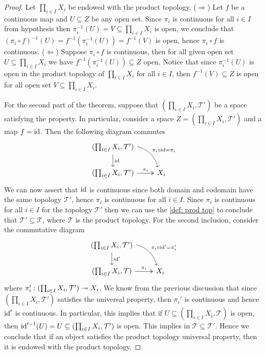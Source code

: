 \begin{proof}
  Let \(\prod_{i \in I} X_i\) be endowed with the product topology.
  (\(\Rightarrow\)) Let \(f\) be a continuous map and \(U \subseteq Z\) be any
  open set. Since \(\pi_i\) is continuous for all \(i \in I\) from hypothesis
  then \(\pi_i^{-1}(U) = V \subseteq \prod_{i \in I} X_i\) is open, we conclude
  that \((\pi_i \circ f)^{-1}(U) = f^{-1}(\pi_i^{-1}(U)) = f^{-1}(V)\) is open,
  hence \(\pi_i \circ f\) is continuous. (\(\Leftarrow\)) Suppose \(\pi_i \circ
  f\) is continuous, then for all given open set \(U \subseteq \prod_{i \in I}
  X_i\) we have \(f^{-1}(\pi_i^{-1}(U)) \subseteq Z\) open. Notice that since
  \(\pi_i^{-1}(U)\) is open in the product topology of \(\prod_{i \in I} X_i\)
  for all \(i \in I\), then \(f^{-1}(V) \subseteq Z\) is open for all open set
  \(V \subseteq \prod_{i \in I} X_i\).

  For the second part of the theorem, suppose that \((\prod_{i \in I} X_i,
  \mathcal T')\) be a space satisfying the property. In particular, consider a
  space \(Z = (\prod_{i \in I} X_i, \mathcal T')\) and a map \(f = \operatorname{id}\). Then
  the following diagram commutes
  \[
    \begin{tikzcd}
      (\prod_{i \in I} X_i, \mathcal T') 
      \ar[d, "\Id"] 
      \ar[dr, bend left, "\pi_i \circ \Id = \pi_i"] \\
      (\prod_{i \in I} X_i, \mathcal T')
      \ar[r, two heads, "\pi_i"]
        &X_i 
    \end{tikzcd}
  \] 
  We can now assert that \(\operatorname{id}\) is continuous since both domain and codomain
  have the same topology \(\mathcal T'\), hence \(\pi_i\) is continuous for all
  \(i \in I\). Since \(\pi_i\) is continuous for all \(i \in I\) for the
  topology \(\mathcal T'\) then we can use the \cref{def: prod top} to conclude
  that \(\mathcal T' \subseteq \mathcal T\), where \(\mathcal T\) is the product
  topology. For the second inclusion, consider the commutative diagram
  \[
    \begin{tikzcd}
      (\prod_{i \in I} X_i, \mathcal T') 
      \ar[d, "\Id'"] 
      \ar[dr, bend left, "\pi_i \circ \Id' = \pi_i'"] \\
      (\prod_{i \in I} X_i, \mathcal T)
      \ar[r, two heads, "\pi_i"]
        &X_i 
    \end{tikzcd}
  \] 
  where \(\pi_i': (\prod_{i \in I} X_i, \mathcal T') \twoheadrightarrow X_i\). We know from
  the previous discussion that since \((\prod_{i \in I} X_i, \mathcal T')\)
  satisfies the universal property, then \(\pi_i'\) is continuous and hence
  \(\operatorname{id}'\) is continuous. In particular, this implies that if  \(U \subseteq
  (\prod_{i \in I} X_i, \mathcal T)\) is open, then \(\operatorname{id}'^{-1}(U) = U
  \subseteq (\prod_{i \in I} X_i, \mathcal T')\) is open. This implies in
  \(\mathcal T \subseteq \mathcal T'\). Hence we conclude that if an object
  satisfies the product topology universal property, then it is endowed with the
  product topology.
\end{proof}

